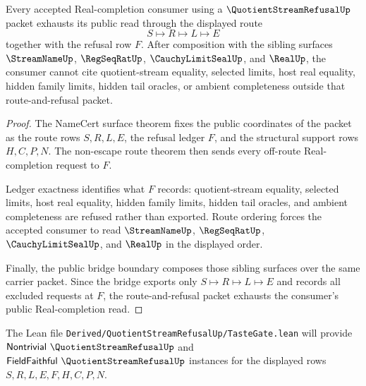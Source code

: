 \begin{theorem}
\label{thm:quotient-stream-refusal-real-completion-consumer-exhaustion}
Every accepted Real-completion consumer using a $\QuotientStreamRefusalUp$ packet exhausts its public read through the displayed route
$$
S \longmapsto R \longmapsto L \longmapsto E
$$
together with the refusal row $F$. After composition with the sibling surfaces $\StreamNameUp$, $\RegSeqRatUp$, $\CauchyLimitSealUp$, and $\RealUp$, the consumer cannot cite quotient-stream equality, selected limits, host real equality, hidden family limits, hidden tail oracles, or ambient completeness outside that route-and-refusal packet.
\end{theorem}
\begin{proof}
The NameCert surface theorem fixes the public coordinates of the packet as the route rows $S,R,L,E$, the refusal ledger $F$, and the structural support rows $H,C,P,N$. The non-escape route theorem then sends every off-route Real-completion request to $F$.

Ledger exactness identifies what $F$ records: quotient-stream equality, selected limits, host real equality, hidden family limits, hidden tail oracles, and ambient completeness are refused rather than exported. Route ordering forces the accepted consumer to read $\StreamNameUp$, $\RegSeqRatUp$, $\CauchyLimitSealUp$, and $\RealUp$ in the displayed order.

Finally, the public bridge boundary composes those sibling surfaces over the same carrier packet. Since the bridge exports only $S \longmapsto R \longmapsto L \longmapsto E$ and records all excluded requests at $F$, the route-and-refusal packet exhausts the consumer's public Real-completion read.
\end{proof}



The Lean file \texttt{Derived/QuotientStreamRefusalUp/TasteGate.lean} will provide $\mathsf{Nontrivial}\ \QuotientStreamRefusalUp$ and $\mathsf{FieldFaithful}\ \QuotientStreamRefusalUp$ instances for the displayed rows $S,R,L,E,F,H,C,P,N$.


